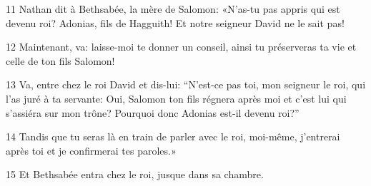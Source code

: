 
11 Nathan dit à Bethsabée, la mère de Salomon: «N’as-tu pas appris qui est devenu roi? Adonias, fils de Hagguith! Et notre seigneur David ne le sait pas!

12 Maintenant, va: laisse-moi te donner un conseil, ainsi tu préserveras ta vie et celle de ton fils Salomon!

13 Va, entre chez le roi David et dis-lui: “N’est-ce pas toi, mon seigneur le roi, qui l’as juré à ta servante: Oui, Salomon ton fils régnera après moi et c’est lui qui s’assiéra sur mon trône? Pourquoi donc Adonias est-il devenu roi?”

14 Tandis que tu seras là en train de parler avec le roi, moi-même, j’entrerai après toi et je confirmerai tes paroles.»

15 Et Bethsabée entra chez le roi, jusque dans sa chambre.